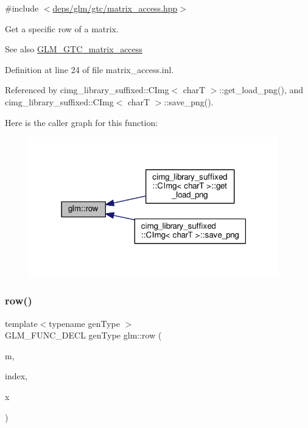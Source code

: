{\ttfamily \#include $<$\hyperlink{matrix__access_8hpp}{deps/glm/gtc/matrix\+\_\+access.\+hpp}$>$}

Get a specific row of a matrix. \begin{DoxySeeAlso}{See also}
\hyperlink{group__gtc__matrix__access}{G\+L\+M\+\_\+\+G\+T\+C\+\_\+matrix\+\_\+access} 
\end{DoxySeeAlso}


Definition at line 24 of file matrix\+\_\+access.\+inl.



Referenced by cimg\+\_\+library\+\_\+suffixed\+::\+C\+Img$<$ char\+T $>$\+::get\+\_\+load\+\_\+png(), and cimg\+\_\+library\+\_\+suffixed\+::\+C\+Img$<$ char\+T $>$\+::save\+\_\+png().

Here is the caller graph for this function\+:
\nopagebreak
\begin{figure}[H]
\begin{center}
\leavevmode
\includegraphics[width=307pt]{da/da6/group__gtc__matrix__access_ga259e5ebd0f31ec3f83440f8cae7f5dba_icgraph}
\end{center}
\end{figure}
\mbox{\label{group__gtc__matrix__access_gaadcc64829aadf4103477679e48c7594f}} 
\subsubsection{\texorpdfstring{row()}{row()}\hspace{0.1cm}{\footnotesize\ttfamily [2/2]}}
{\footnotesize\ttfamily template$<$typename gen\+Type $>$ \\
G\+L\+M\+\_\+\+F\+U\+N\+C\+\_\+\+D\+E\+CL gen\+Type glm\+::row (\begin{DoxyParamCaption}\item[{gen\+Type const \&}]{m,  }\item[{length\+\_\+t}]{index,  }\item[{typename gen\+Type\+::row\+\_\+type const \&}]{x }\end{DoxyParamCaption})}



